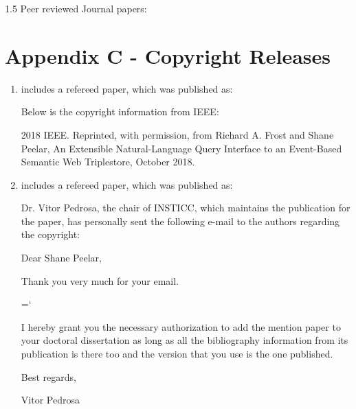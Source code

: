 \documentclass[fleqn, oneside, 12pt]{book}
\theoremstyle{definitionsty}
\newcommand{\uwinonehalfspacelen}{1.5}
\newcommand{\uwindefaultspacelen}{\uwinonehalfspacelen}
\newenvironment{uwindefaultspaceenv}%
{\begin{spacing}{\uwindefaultspacelen}}%
	{\end{spacing}}
\begin{document}
\begin{uwindefaultspaceenv}
Peer reviewed Journal papers:

\cite{peelar2019real} 



\section*{Appendix C - Copyright Releases}


\begin{enumerate}
	\item { includes a refereed paper, which was published as:


	Below is the copyright information from IEEE:

	2018 IEEE. Reprinted, with permission, from Richard A. Frost and Shane Peelar, An Extensible Natural-Language Query Interface to an Event-Based Semantic Web Triplestore, October 2018.}

	\item { includes a refereed paper, which was published as:


	Dr. Vitor Pedrosa, the chair of INSTICC, which maintains the publication for the paper, has personally sent the following e-mail to the authors regarding the copyright:


		{ \ttfamily
		Dear Shane Peelar,


		Thank you very much for your email.


		\hyphenchar\font=`\-%

		I hereby grant you the necessary authorization to add the mention
		paper to your doctoral dissertation as long as all the bibliography
		information from its publication is there too and the version
		that you use is the one published.


		Best regards,


		Vitor Pedrosa
		}

	}


\end{enumerate}
\end{uwindefaultspaceenv}
\end{document}
